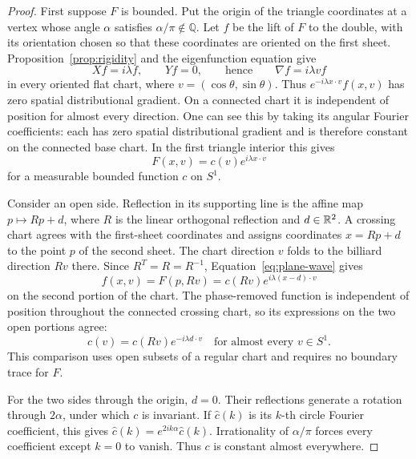 \begin{proof}
First suppose \(F\) is bounded. Put the origin of the triangle coordinates
at a vertex whose angle \(\alpha\) satisfies \(\alpha/\pi\notin\mathbb Q\).
Let \(f\) be the lift of \(F\) to the double, with its orientation chosen
so that these coordinates are oriented on the first sheet.
Proposition~\ref{prop:rigidity} and the eigenfunction equation give
\[
 Xf=i\lambda f,\qquad Yf=0,
 \qquad\text{hence}\qquad \nabla f=i\lambda v f
\]
in every oriented flat chart, where \(v=(\cos\theta,\sin\theta)\).
Thus \(e^{-i\lambda x\cdot v}f(x,v)\) has zero spatial distributional
gradient. On a connected chart it is independent of position for almost
every direction. One can see this by taking its angular Fourier coefficients:
each has zero spatial distributional gradient and is therefore constant
on the connected base chart. In the first triangle interior this gives
\begin{equation}\label{eq:plane-wave}
 F(x,v)=c(v)e^{i\lambda x\cdot v}
\end{equation}
for a measurable bounded function \(c\) on \(S^1\).

Consider an open side. Reflection in its supporting line is the affine map
\(p\mapsto Rp+d\), where \(R\) is the linear orthogonal reflection and
\(d\in\mathbb R^2\). A crossing chart agrees with the first-sheet coordinates
and assigns coordinates \(x=Rp+d\) to the point \(p\) of the second sheet.
The chart direction \(v\) folds to the billiard direction \(Rv\) there.
Since \(R^T=R=R^{-1}\), Equation~\eqref{eq:plane-wave} gives
\[
 f(x,v)=F(p,Rv)=c(Rv)e^{i\lambda (x-d)\cdot v}
\]
on the second portion of the chart. The phase-removed function is independent
of position throughout the connected crossing chart, so its expressions on
the two open portions agree:
\begin{equation}\label{eq:side-relation}
 c(v)=c(Rv)e^{-i\lambda d\cdot v}
 \quad\text{for almost every }v\in S^1.
\end{equation}
This comparison uses open subsets of a regular chart and requires no
boundary trace for \(F\).

For the two sides through the origin, \(d=0\). Their reflections generate
a rotation through \(2\alpha\), under which \(c\) is invariant.
If \(\widehat c(k)\) is its \(k\)-th circle Fourier coefficient, this gives
\(\widehat c(k)=e^{2ik\alpha}\widehat c(k)\). Irrationality of
\(\alpha/\pi\) forces every coefficient except \(k=0\) to vanish.
Thus \(c\) is constant almost everywhere.


\end{proof}
